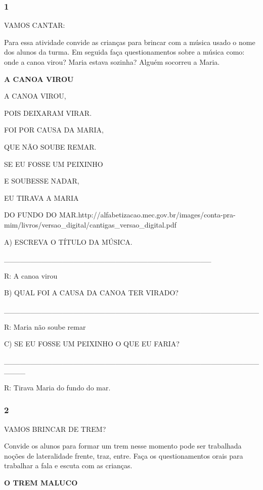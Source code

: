 \subsubsection{1 }\label{section-29}

VAMOS CANTAR:

Para essa atividade convide as crianças para brincar com a música usado
o nome dos alunos da turma. Em seguida faça questionamentos sobre a
música como: onde a canoa virou? Maria estava sozinha? Alguém socorreu a
Maria.

\textbf{A CANOA VIROU}

A CANOA VIROU,

POIS DEIXARAM VIRAR.

FOI POR CAUSA DA MARIA,

QUE NÃO SOUBE REMAR.

SE EU FOSSE UM PEIXINHO

E SOUBESSE NADAR,

EU TIRAVA A MARIA

DO FUNDO DO
MAR.http://alfabetizacao.mec.gov.br/images/conta-pra-mim/livros/versao\_digital/cantigas\_versao\_digital.pdf

A) ESCREVA O TÍTULO DA MÚSICA.

\_\_\_\_\_\_\_\_\_\_\_\_\_\_\_\_\_\_\_\_\_\_\_\_\_\_\_\_\_\_\_\_\_\_\_\_\_\_\_

R: A canoa virou

B) QUAL FOI A CAUSA DA CANOA TER VIRADO?

\_\_\_\_\_\_\_\_\_\_\_\_\_\_\_\_\_\_\_\_\_\_\_\_\_\_\_\_\_\_\_\_\_\_\_\_\_\_\_\_\_\_\_\_\_\_\_\_

R: Maria não soube remar

C) SE EU FOSSE UM PEIXINHO O QUE EU FARIA?

\_\_\_\_\_\_\_\_\_\_\_\_\_\_\_\_\_\_\_\_\_\_\_\_\_\_\_\_\_\_\_\_\_\_\_\_\_\_\_\_\_\_\_\_\_\_\_\_\_\_\_\_

R: Tirava Maria do fundo do mar.

\subsubsection{2 }\label{section-30}

VAMOS BRINCAR DE TREM?

Convide os alunos para formar um trem nesse momento pode ser trabalhada
noções de lateralidade frente, traz, entre. Faça os questionamentos
orais para trabalhar a fala e escuta com as crianças.

\textbf{O TREM MALUCO}

